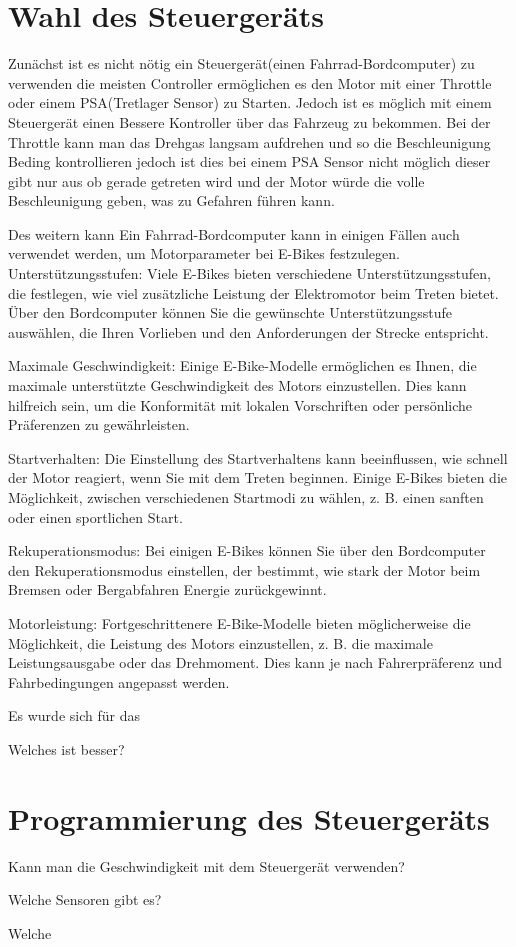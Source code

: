 \section{Wahl des Steuergeräts}
 
Zunächst ist es nicht nötig ein Steuergerät(einen Fahrrad-Bordcomputer) zu verwenden die meisten Controller ermöglichen es den Motor mit einer Throttle oder einem PSA(Tretlager Sensor) zu Starten. Jedoch ist es möglich mit einem Steuergerät einen Bessere Kontroller über das Fahrzeug zu bekommen. Bei der Throttle kann man das Drehgas langsam aufdrehen und so die Beschleunigung Beding kontrollieren jedoch ist dies bei einem PSA Sensor nicht möglich dieser gibt nur aus ob gerade getreten wird und der Motor würde die volle Beschleunigung geben, was zu Gefahren führen kann. 

Des weitern kann Ein Fahrrad-Bordcomputer kann in einigen Fällen auch verwendet werden, um Motorparameter bei E-Bikes festzulegen.     Unterstützungsstufen: Viele E-Bikes bieten verschiedene Unterstützungsstufen, die festlegen, wie viel zusätzliche Leistung der Elektromotor beim Treten bietet. Über den Bordcomputer können Sie die gewünschte Unterstützungsstufe auswählen, die Ihren Vorlieben und den Anforderungen der Strecke entspricht.

Maximale Geschwindigkeit: Einige E-Bike-Modelle ermöglichen es Ihnen, die maximale unterstützte Geschwindigkeit des Motors einzustellen. Dies kann hilfreich sein, um die Konformität mit lokalen Vorschriften oder persönliche Präferenzen zu gewährleisten.

Startverhalten: Die Einstellung des Startverhaltens kann beeinflussen, wie schnell der Motor reagiert, wenn Sie mit dem Treten beginnen. Einige E-Bikes bieten die Möglichkeit, zwischen verschiedenen Startmodi zu wählen, z. B. einen sanften oder einen sportlichen Start.

Rekuperationsmodus: Bei einigen E-Bikes können Sie über den Bordcomputer den Rekuperationsmodus einstellen, der bestimmt, wie stark der Motor beim Bremsen oder Bergabfahren Energie zurückgewinnt.

Motorleistung: Fortgeschrittenere E-Bike-Modelle bieten möglicherweise die Möglichkeit, die Leistung des Motors einzustellen, z. B. die maximale Leistungsausgabe oder das Drehmoment. Dies kann je nach Fahrerpräferenz und Fahrbedingungen angepasst werden.




Es wurde sich für das 


Welches ist besser?


\section{Programmierung des Steuergeräts}

Kann man die Geschwindigkeit mit dem Steuergerät verwenden?

Welche Sensoren gibt es?

Welche
